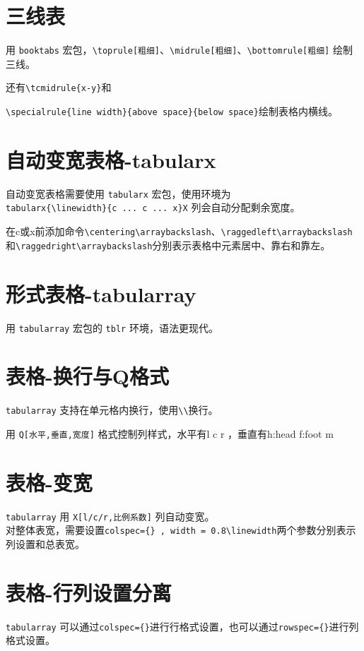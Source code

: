 \documentclass[12pt,a4paper]{ctexart}
\begin{document}
\section{三线表}
用 \verb|booktabs| 宏包，\verb|\toprule[粗细]|、\verb|\midrule[粗细]|、\verb|\bottomrule[粗细]| 绘制三线。

还有\verb|\tcmidrule{x-y}|和

\verb|\specialrule{line width}{above space}{below space}|绘制表格内横线。

\section{自动变宽表格-tabularx}
自动变宽表格需要使用 \verb|tabularx| 宏包，使用环境为\\
\verb|tabularx{\linewidth}{c ... c ... x}|\verb|X| 列会自动分配剩余宽度。

在c或x前添加命令\verb|\centering\arraybackslash|、\verb|\raggedleft\arraybackslash|\\
和\verb|\raggedright\arraybackslash|分别表示表格中元素居中、靠右和靠左。

\section{形式表格-tabularray}
用 \verb|tabularray| 宏包的 \verb|tblr| 环境，语法更现代。

\section{表格-换行与Q格式}
\verb|tabularray| 支持在单元格内换行，使用\verb|\\|换行。

用 \verb|Q[水平,垂直,宽度]| 格式控制列样式，水平有l c r ，垂直有h:head f:foot m

\section{表格-变宽}
\verb|tabularray| 用 \verb|X[l/c/r,比例系数]| 列自动变宽。\\
对整体表宽，需要设置\verb|colspec={} , width = 0.8\linewidth|两个参数分别表示列设置和总表宽。

\section{表格-行列设置分离}
\verb|tabularray| 可以通过\verb|colspec={}|进行行格式设置，也可以通过\verb|rowspec={}|进行列格式设置。
\end{document}
